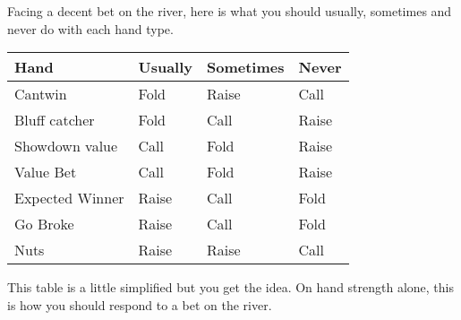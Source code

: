 Facing a decent bet on the river, here is what you should
usually, sometimes and never do with each hand type.

\begin{tabular}{|l|l|l|l|} \hline
Hand    &  Usually & Sometimes & Never \\ \hline
Cantwin & Fold  & Raise     & Call  \\ \hline
Bluff catcher  & Fold & Call & Raise \\ \hline
Showdown value & Call & Fold & Raise \\ \hline
Value Bet & Call & Fold & Raise \\ \hline
Expected Winner & Raise & Call & Fold \\ \hline
Go Broke & Raise & Call & Fold \\ \hline
Nuts     & Raise & Raise & Call \\ \hline
\end{tabular}

This table is a little simplified but you get the idea. On hand strength
alone, this is how you should respond to a bet on the river.
